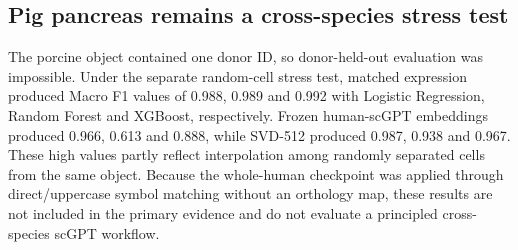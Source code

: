 \subsection{Pig pancreas remains a cross-species stress test}

The porcine object contained one donor ID, so donor-held-out evaluation was impossible. Under the separate random-cell stress test, matched expression produced Macro F1 values of 0.988, 0.989 and 0.992 with Logistic Regression, Random Forest and XGBoost, respectively. Frozen human-scGPT embeddings produced 0.966, 0.613 and 0.888, while SVD-512 produced 0.987, 0.938 and 0.967. These high values partly reflect interpolation among randomly separated cells from the same object. Because the whole-human checkpoint was applied through direct/uppercase symbol matching without an orthology map, these results are not included in the primary evidence and do not evaluate a principled cross-species scGPT workflow.
